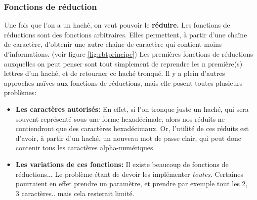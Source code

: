\documentclass[french,12pt]{article}
\begin{document}
         \subsubsection{Fonctions de réduction}\label{section:reductions}
         Une fois que l'on a un haché, on veut pouvoir le \textbf{réduire.} Les fonctions de réductions sont des fonctions arbitraires. Elles permettent, à partir d'une chaîne de caractère, d'obtenir une autre chaîne de caractère qui contient moins d'informations. (voir figure \ref{fig:rbtprincipe})
         \newline
         \indent Les premières fonctions de réductions auxquelles on peut penser sont tout simplement de reprendre les n première(s) lettres d'un haché, et de retourner ce haché tronqué. Il y a plein d'autres approches naïves aux fonctions de réductions, mais elle posent toutes plusieurs problèmes:
         \begin{itemize}
             \item \textbf{Les caractères autorisés: } En effet, si l'on tronque juste un haché, qui sera souvent représenté sous une forme hexadécimale, alors nos réduits ne contiendront que des caractères hexadécimaux. Or, l'utilité de ces réduits est d'avoir, à partir d'un haché, un nouveau mot de passe clair, qui peut donc contenir tous les caractères alpha-numériques.
             \item \textbf{Les variations de ces fonctions: } Il existe beaucoup de fonctions de réductions... Le problème étant de devoir les implémenter \textit{toutes.} Certaines pourraient en effet prendre un paramètre, et prendre par exemple tout les 2, 3 caractères.. mais cela resterait limité.
         \end{itemize}
\end{document}
